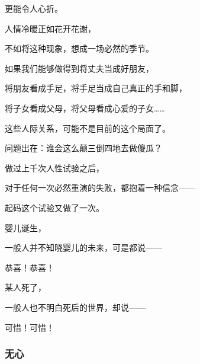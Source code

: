 \par 更能令人心折。
\par 
\par 人情冷暖正如花开花谢，
\par 不如将这种现象，想成一场必然的季节。
\par 
\par 如果我们能够做得到将丈夫当成好朋友，
\par 将朋友看成手足，将手足当成自己真正的手和脚，
\par 将子女看成父母，将父母看成心爱的子女……
\par 这些人际关系，可能不是目前的这个局面了。
\par 问题出在：谁会这么颠三倒四地去做傻瓜？
\par 
\par 做过上千次人性试验之后，
\par 对于任何一次必然重演的失败，都抱着一种信念——
\par 起码这个试验又做了一次。
\par 
\par 婴儿诞生，
\par 一般人并不知晓婴儿的未来，可是都说——
\par 恭喜！恭喜！
\par 某人死了，
\par 一般人也不明白死后的世界，却说——
\par 可惜！可惜！




\subsubsection{无心}


